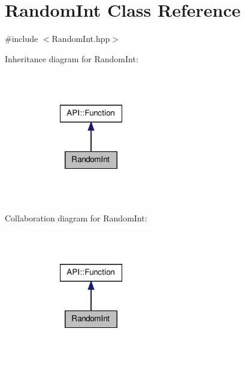 \hypertarget{class_random_int}{\section{Random\-Int Class Reference}
\label{class_random_int}
}


{\ttfamily \#include $<$Random\-Int.\-hpp$>$}



Inheritance diagram for Random\-Int\-:\nopagebreak
\begin{figure}[H]
\begin{center}
\leavevmode
\includegraphics[width=156pt]{class_random_int__inherit__graph}
\end{center}
\end{figure}


Collaboration diagram for Random\-Int\-:\nopagebreak
\begin{figure}[H]
\begin{center}
\leavevmode
\includegraphics[width=156pt]{class_random_int__coll__graph}
\end{center}
\end{figure}
